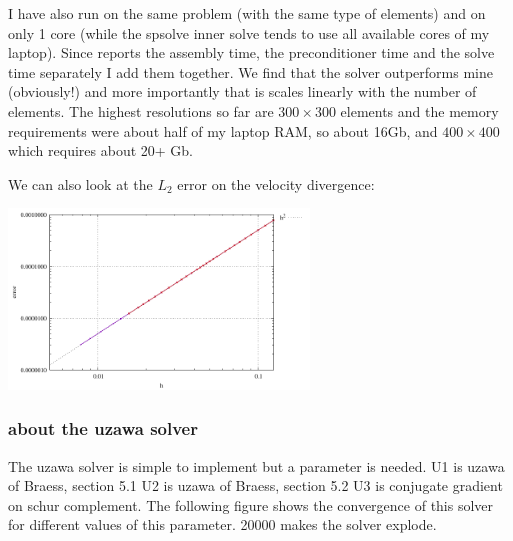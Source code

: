 I have also run \aspect on the same problem (with the same type of elements) and on only 
1 core (while the spsolve inner solve tends to use all available cores of my laptop). 
Since \aspect reports the assembly time, the preconditioner time and the solve
time separately I add them together.
We find that the solver outperforms mine (obviously!) and more importantly that 
is scales linearly with the number of elements. 
The highest resolutions so far are $300\times 300$ elements and the memory requirements 
were about half of my laptop RAM, so about 16Gb, and $400\times 400$ which requires
about 20+ Gb.


We can also look at the $L_2$ error on the velocity divergence:

\begin{center}
\includegraphics[width=8cm]{python_codes/fieldstone_147/RESULTS/error_divv.pdf}
\end{center}

\newpage
\subsubsection*{about the uzawa solver}

The uzawa solver is simple to implement but a parameter is needed. 
U1 is uzawa of Braess, section 5.1
U2 is uzawa of Braess, section 5.2
U3 is conjugate gradient on schur complement.
The following figure shows the convergence of this solver for different values of this parameter.
20000 makes the solver explode.	

